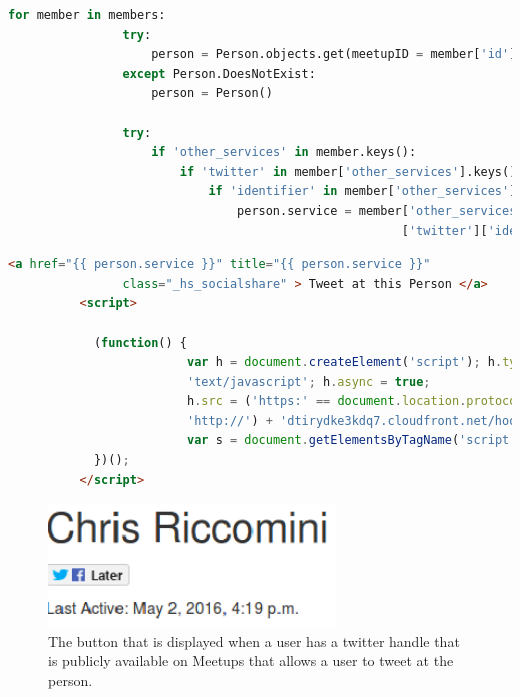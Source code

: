 \documentclass[draftclsnofoot,10pt,onecolumn]{IEEEtran} %
\begin{document}
\begin{enumerate}
\begin{center}
\begin{lstlisting}[caption=Views.py file where twitter handle is identified and stored, language=Python]
            for member in members:
                try:
                    person = Person.objects.get(meetupID = member['id'])
                except Person.DoesNotExist:
                    person = Person()

                try:        
                    if 'other_services' in member.keys():
                        if 'twitter' in member['other_services'].keys():
                            if 'identifier' in member['other_services']['twitter'].keys():
                                person.service = member['other_services'}
                                                       ['twitter']['identifier']
  \end{lstlisting}
\end{center}
    
  \begin{center}
  \captionsetup{width=.5\linewidth}
   \begin{lstlisting}[caption=View.py where the button for tweeting at a person is created and twitter handle is displayed., language=HTML]
        <a href="{{ person.service }}" title="{{ person.service }}" 
        		class="_hs_socialshare" > Tweet at this Person </a>
          <script>
            
            (function() {
                         var h = document.createElement('script'); h.type = 
                         'text/javascript'; h.async = true;
                         h.src = ('https:' == document.location.protocol ? 'https://' : 
                         'http://') + 'dtirydke3kdq7.cloudfront.net/hootlet.js?v=1';
                         var s = document.getElementsByTagName('script')[0]; s.parentNode.insertBefore(h, s);
            })();
          </script>
   \end{lstlisting}
\end{center}

\newpage

\begin{figure}[H]
  \begin{center}
  \includegraphics[width=3in, frame]{tweet_person1}
  	\captionsetup{width=.4\linewidth}
  \centering
  \caption{The button that is displayed when a user has a twitter handle that is publicly available on Meetups that allows a user to tweet at the person.}


\end{center}
\end{figure}
\end{enumerate}
\end{document}

